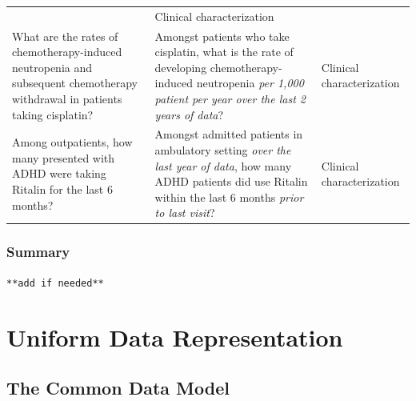 \documentclass[11pt]{book}
\theoremstyle{definition}
\theoremstyle{definition}
\theoremstyle{definition}
\theoremstyle{remark}
\begin{document}
\begin{longtable}[]{@{}lll@{}}
\begin{minipage}[t]{0.30\columnwidth}
\end{minipage} & \begin{minipage}[t]{0.30\columnwidth}\raggedright
Clinical characterization\strut
\end{minipage}\tabularnewline
\begin{minipage}[t]{0.30\columnwidth}\raggedright
What are the rates of chemotherapy-induced neutropenia and subsequent chemotherapy withdrawal in patients taking cisplatin?\strut
\end{minipage} & \begin{minipage}[t]{0.30\columnwidth}\raggedright
Amongst patients who take cisplatin, what is the rate of developing chemotherapy-induced neutropenia \emph{per 1,000 patient per year over the last 2 years of data}?\strut
\end{minipage} & \begin{minipage}[t]{0.30\columnwidth}\raggedright
Clinical characterization\strut
\end{minipage}\tabularnewline
\begin{minipage}[t]{0.30\columnwidth}\raggedright
Among outpatients, how many presented with ADHD were taking Ritalin for the last 6 months?\strut
\end{minipage} & \begin{minipage}[t]{0.30\columnwidth}\raggedright
Amongst admitted patients in ambulatory setting \emph{over the last year of data}, how many ADHD patients did use Ritalin within the last 6 months \emph{prior to last visit}?\strut
\end{minipage} & \begin{minipage}[t]{0.30\columnwidth}\raggedright
Clinical characterization\strut
\end{minipage}\tabularnewline
\bottomrule
\end{longtable}

\hypertarget{summary}{%
\section{Summary}\label{summary}}

\texttt{**add\ if\ needed**}

\hypertarget{part-uniform-data-representation}{%
\part{Uniform Data Representation}\label{part-uniform-data-representation}}

\hypertarget{CommonDataModel}{%
\chapter{The Common Data Model}\label{CommonDataModel}}
\end{document}
